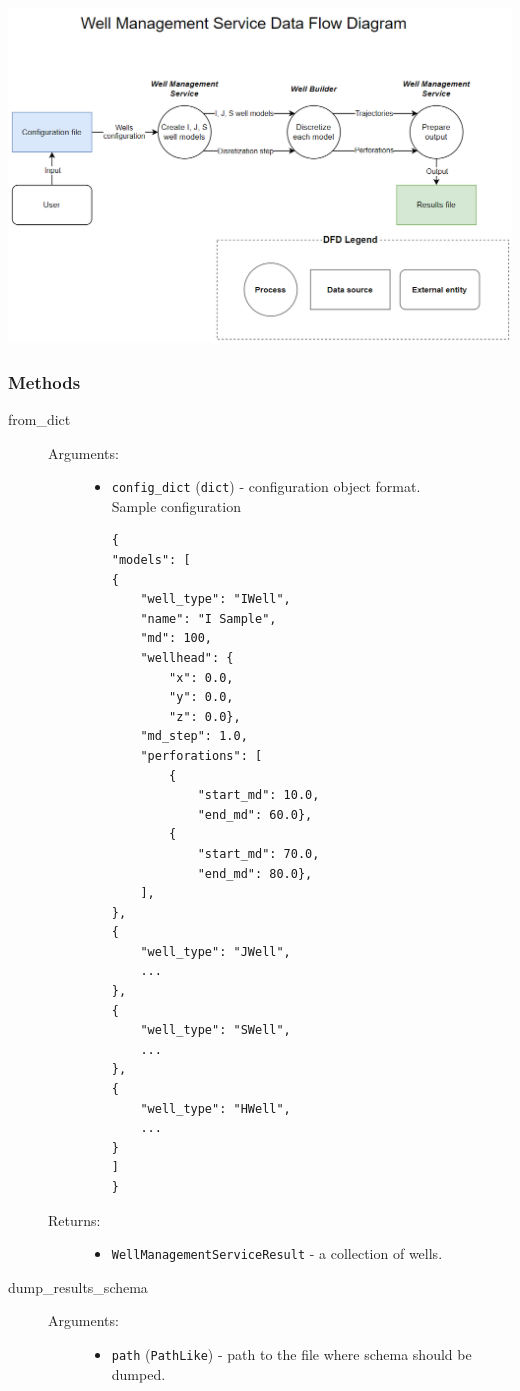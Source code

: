 \includegraphics[width=1.0\textwidth]{images/well_management_service/WMS_Data-Flow-Diagram.png}

\subsubsection{Methods}

\begin{description}

\item[ \colorbox{gray!20}{from\_dict}] \hfill
\begin{description}
\item[Arguments:] \hfill
\begin{itemize}
    \item \texttt{config\_dict} (\texttt{dict}) - configuration object format.\\
    Sample configuration\\
    \begin{lstlisting}
{
"models": [
{
	"well_type": "IWell",
	"name": "I Sample",
	"md": 100,
	"wellhead": {
		"x": 0.0,
		"y": 0.0,
		"z": 0.0},
	"md_step": 1.0,
	"perforations": [
		{
			"start_md": 10.0,
			"end_md": 60.0},
		{
			"start_md": 70.0,
			"end_md": 80.0},
	],
},
{
	"well_type": "JWell",
	...
},
{
	"well_type": "SWell",
	...
},
{
	"well_type": "HWell",
	...
}
]
}
\end{lstlisting}
    \end{itemize}
        \item[Returns:] \hfill
        \begin{itemize}
            \item \texttt{WellManagementServiceResult} - a collection of wells.
        \end{itemize}
    \end{description}
    \item[\colorbox{gray!20}{dump\_results\_schema}] \hfill
    \begin{description}
        \item[Arguments:] \hfill
        \begin{itemize}
            \item \texttt{path} (\texttt{PathLike}) - path to the file where schema should be dumped.
        \end{itemize}
    \end{description}
\end{description}
